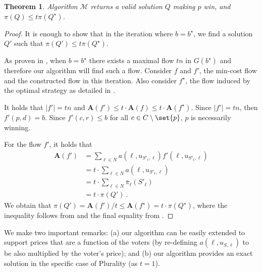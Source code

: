 \documentclass[letterpaper]{article} %
\newtheorem{theorem}{Theorem}
\newcommand{\vecc}{\mathbf}
\newcommand{\Cmp}{C \setminus \set{p}}
\newcommand{\abs}[1]{\lvert{#1}\rvert}
\newcommand{\Aoper}[1]{\vecc{A}({#1})}
\begin{document}
\begin{theorem}
Algorithm $\mathcal{M}$ returns a valid solution $Q$ making $p$ win, and $\pi(Q) \leq t \pi(Q^{\star})$.
\end{theorem}
\begin{proof}
It is enough to show that in the iteration where $b = b^{\star}$, we find a solution  $Q' $ such that $\pi(Q' ) \leq t \pi(Q^{\star})$.

As proven in , when $b = b^{\star}$ there exists a maximal flow $tn$ in $G(b^{\star})$ and therefore our algorithm will find such a flow. Consider $f$ and $f'$, the min-cost flow and the constructed flow in this iteration. Also consider  $f^\star$, the flow induced by the optimal strategy as detailed in .

It holds that $\abs{f'} = tn$ and $\Aoper{f'} \leq t \cdot \Aoper{f} \leq t \cdot \Aoper{f^\star} $. Since $\abs{f'} = tn$, then $f'(p,d)=b$. Since $f'(c,r)\leq b$ for all $c \in \Cmp$, $p$ is necessarily winning.

For the flow $f'$,  it holds that 
\begin{align*}
    \Aoper{f'} &= \sum_{\ell \in N}a(\ell, u_{S'_\ell, \ell})f'(\ell, u_{S'_\ell, \ell})\\
    &= t \cdot \sum_{\ell \in N}a(\ell, u_{S'_\ell, \ell})\\
    &=  t \cdot \sum_{\ell \in N}\bar{\pi}_{\ell}(S'_\ell)\\
    &= t\cdot \pi(Q')\ .
\end{align*}
We obtain that $\pi(Q') = \Aoper{f'}/t \leq  \Aoper{f^\star} = t \cdot \pi(Q^\star)$, where the inequality follows from  and the final equality from .
\end{proof}
We make two important remarks: (a) our algorithm can be easily extended to support prices that are a function of the voters (by re-defining $a(\ell, u_{S,\ell})$ to be also multiplied by the voter's price); and (b) our algorithm provides an exact solution in the specific case of Plurality (as $t=1$).
\end{document}

